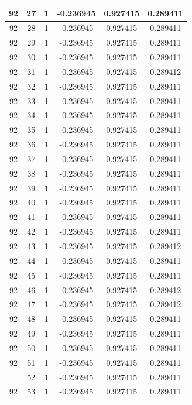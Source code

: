 \documentclass[12pt,a4paper]{article}
\numberwithin{equation}{section}
\numberwithin{figure}{section}
\numberwithin{table}{section}
\begin{document}
\begin{longtable}{|c|c|c|c|c|c|}
92 & 27 & 1 & -0.236945 & 0.927415 & 0.289411 \\ \hline
92 & 28 & 1 & -0.236945 & 0.927415 & 0.289411 \\ \hline
92 & 29 & 1 & -0.236945 & 0.927415 & 0.289411 \\ \hline
92 & 30 & 1 & -0.236945 & 0.927415 & 0.289411 \\ \hline
92 & 31 & 1 & -0.236945 & 0.927415 & 0.289412 \\ \hline
92 & 32 & 1 & -0.236945 & 0.927415 & 0.289411 \\ \hline
92 & 33 & 1 & -0.236945 & 0.927415 & 0.289411 \\ \hline
92 & 34 & 1 & -0.236945 & 0.927415 & 0.289411 \\ \hline
92 & 35 & 1 & -0.236945 & 0.927415 & 0.289411 \\ \hline
92 & 36 & 1 & -0.236945 & 0.927415 & 0.289411 \\ \hline
92 & 37 & 1 & -0.236945 & 0.927415 & 0.289411 \\ \hline
92 & 38 & 1 & -0.236945 & 0.927415 & 0.289411 \\ \hline
92 & 39 & 1 & -0.236945 & 0.927415 & 0.289411 \\ \hline
92 & 40 & 1 & -0.236945 & 0.927415 & 0.289411 \\ \hline
92 & 41 & 1 & -0.236945 & 0.927415 & 0.289411 \\ \hline
92 & 42 & 1 & -0.236945 & 0.927415 & 0.289411 \\ \hline
92 & 43 & 1 & -0.236945 & 0.927415 & 0.289412 \\ \hline
92 & 44 & 1 & -0.236945 & 0.927415 & 0.289411 \\ \hline
92 & 45 & 1 & -0.236945 & 0.927415 & 0.289411 \\ \hline
92 & 46 & 1 & -0.236945 & 0.927415 & 0.289412 \\ \hline
92 & 47 & 1 & -0.236945 & 0.927415 & 0.289412 \\ \hline
92 & 48 & 1 & -0.236945 & 0.927415 & 0.289411 \\ \hline
92 & 49 & 1 & -0.236945 & 0.927415 & 0.289411 \\ \hline
92 & 50 & 1 & -0.236945 & 0.927415 & 0.289411 \\ \hline
92 & 51 & 1 & -0.236945 & 0.927415 & 0.289411 \\ \hline
\pagebreak
92 & 52 & 1 & -0.236945 & 0.927415 & 0.289411 \\ \hline
92 & 53 & 1 & -0.236945 & 0.927415 & 0.289411 \\ \hline

\end{longtable}
\end{document}
